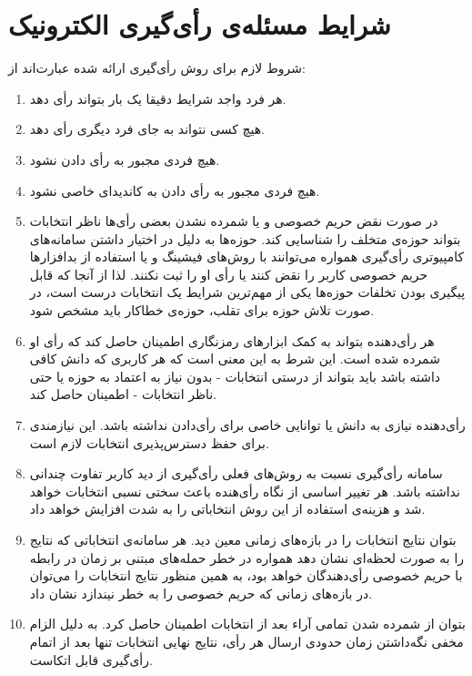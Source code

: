 \section{شرایط مسئله‌ی رأی‌گیری الکترونیک}
شروط لازم برای روش‌ رأی‌گیری ارائه شده عبارت‌اند از:  
\begin{enumerate}
	\item 
	هر فرد واجد شرایط دقیقا یک بار بتواند رأی دهد.
	\item 
	هیچ کسی نتواند به جای فرد دیگری رأی دهد.
	\item 
	هیچ فردی مجبور به رأی دادن نشود.
	\item 
	هیچ فردی مجبور به رأی دادن به کاندیدای خاصی نشود.
	\item 
	در صورت نقض حریم خصوصی و یا شمرده نشدن بعضی رأی‌ها ناظر انتخابات بتواند حوزه‌ی متخلف را شناسایی کند. حوزه‌ها به دلیل در اختیار داشتن سامانه‌های کامپیوتری رأی‌گیری همواره می‌توانند با روش‌های فیشینگ
	و یا استفاده از بد‌افزار‌ها حریم خصوصی کاربر را نقض کنند یا رأی او را ثبت نکنند. لذا از آنجا که قابل پیگیری بودن تخلفات حوزه‌ها یکی از مهم‌ترین شرایط یک انتخابات درست است، در صورت تلاش حوزه برای تقلب، حوزه‌ی خطاکار باید مشخص شود.
	\item 
	هر رأی‌دهنده بتواند به کمک ابزارهای رمزنگاری اطمینان حاصل کند که رأی او شمرده شده است. این شرط به این معنی است که هر کاربری که دانش کافی داشته باشد باید بتواند از درستی انتخابات - بدون نیاز به اعتماد به حوزه یا حتی ناظر انتخابات - اطمینان حاصل کند. 
	\item
	رأی‌دهنده نیازی به دانش یا توانایی خاصی برای رأی‌دادن نداشته باشد. این نیازمندی برای حفظ دسترس‌پذیری انتخابات لازم است.
	\item
	سامانه رأی‌گیری نسبت به روش‌های فعلی رأی‌گیری از دید کاربر تفاوت چندانی نداشته باشد. هر تغییر اساسی از نگاه رأی‌هنده باعث سختی نسبی انتخابات خواهد شد و هزینه‌ی  استفاده از این روش انتخاباتی را به شدت افزایش خواهد داد.
	\item 
	بتوان نتایج انتخابات را در بازه‌های زمانی معین دید. هر سامانه‌ی انتخاباتی که نتایج را به صورت لحظه‌ای نشان دهد همواره در خطر حمله‌های مبتنی بر زمان در رابطه با حریم خصوصی رأی‌دهندگان خواهد بود، به همین منظور نتایج انتخابات را می‌توان در بازه‌های زمانی که حریم خصوصی را به خطر نیندازد نشان داد.
	\item 
	بتوان از شمرده شدن تمامی آراء بعد از انتخابات اطمینان حاصل کرد. به دلیل الزام مخفی نگه‌داشتن زمان حدودی ارسال هر رأی، نتایج نهایی انتخابات تنها بعد از اتمام رأی‌گیری قابل اتکاست.
\end{enumerate}

